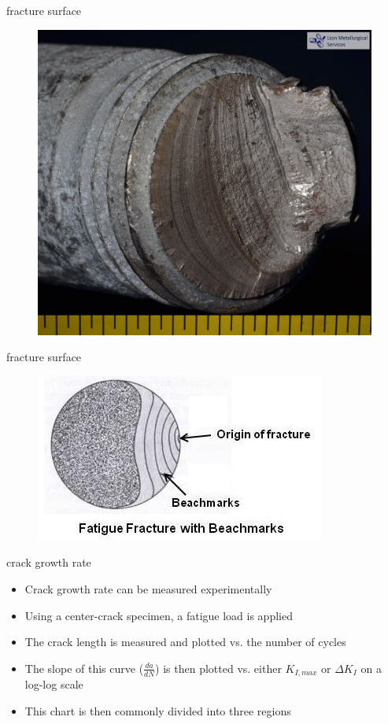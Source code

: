 \documentclass[10pt]{beamer}
\begin{document}
\begin{frame}{fracture surface}
	\begin{figure}
	\centering
	\includegraphics[width=0.7\linewidth]{../Figures/fracture_surface}
	\label{fig:fracture_surface}
	\end{figure}
\end{frame}

\begin{frame}{fracture surface}	
	\begin{figure}
	\centering
	\includegraphics[width=0.7\linewidth]{../Figures/Fatigue-Fracture-with-Beachmarks}
	\label{fig:Fatigue-Fracture-with-Beachmarks}
	\end{figure}
\end{frame}

\begin{frame}{crack growth rate}
	\begin{itemize}[<+->]
		\item Crack growth rate can be measured experimentally 
		\item Using a center-crack specimen, a fatigue load is applied
		\item The crack length is measured and plotted vs. the number of cycles
		\item The slope of this curve ($\frac{da}{dN}$) is then plotted vs. either $K_{I,max}$ or $\Delta K_I$ on a log-log scale
		\item This chart is then commonly divided into three regions
	\end{itemize}
\end{frame}
\end{document}
